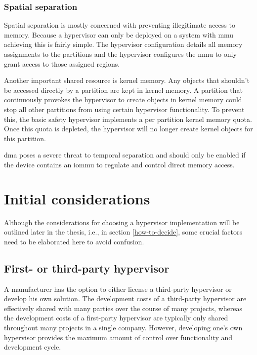 \subsubsection{Spatial separation}
Spatial separation is mostly concerned with preventing illegitimate access to memory. Because a hypervisor can only be deployed on a system with \acrshort{mmu} achieving this is fairly simple. The hypervisor configuration details all memory assignments to the partitions and the hypervisor configures the \acrshort{mmu} to only grant access to those assigned regions. 

Another important shared resource is kernel memory. Any objects that shouldn't be accessed directly by a partition are kept in kernel memory. A partition that continuously provokes the hypervisor to create objects in kernel memory could stop all other partitions from using certain hypervisor functionality. To prevent this, the basic safety hypervisor implements a per partition kernel memory quota. Once this quota is depleted, the hypervisor will no longer create kernel objects for this partition.

\acrshort{dma} poses a severe threat to temporal separation and should only be enabled if the device contains an \acrshort{iommu} to regulate and control direct memory access.

\section{Initial considerations}
Although the considerations for choosing a hypervisor implementation will be outlined later in the thesis, i.e., in section \ref{how-to-decide}, some crucial factors need to be elaborated here to avoid confusion.
\subsection{First- or third-party hypervisor}
A manufacturer has the option to either license a third-party hypervisor or develop his own solution. The development costs of a third-party hypervisor are effectively shared with many parties over the course of many projects, whereas the development costs of a first-party hypervisor are typically only shared throughout many projects in a single company. However, developing one's own hypervisor provides the maximum amount of control over functionality and development cycle.

